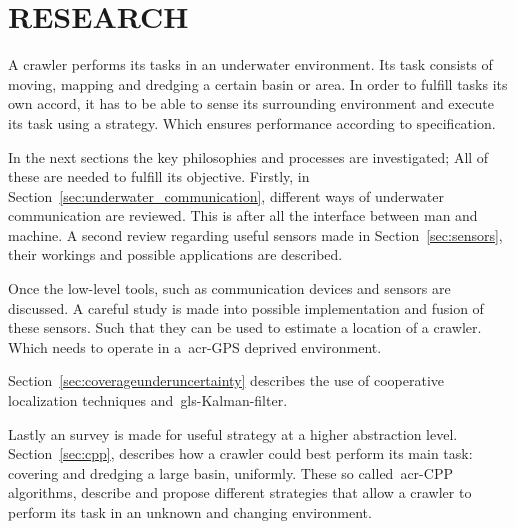\chapter{RESEARCH}\label{chap:research}
A crawler performs its tasks in an underwater environment. Its task consists of moving, mapping and dredging a certain basin or area. In order to fulfill tasks its own accord, it has to be able to sense its surrounding environment and execute its task using a strategy. Which ensures performance according to specification.

In the next sections the key philosophies and processes are investigated; All of these are needed to fulfill its objective. Firstly, in Section~\ref{sec:underwater_communication}, different ways of underwater communication are reviewed. This is after all the interface between man and machine. A second review regarding useful sensors made in Section~\ref{sec:sensors}, their workings and possible applications are described.

Once the low-level tools, such as communication devices and sensors are discussed. A careful study is made into possible implementation and fusion of these sensors. Such that they can be used to estimate a location of a crawler. Which needs to operate in a~\gls{acr-GPS} deprived environment.

Section~\ref{sec:coverageunderuncertainty} describes the use of cooperative localization techniques and~\gls{gls-Kalman-filter}.

Lastly an survey is made for useful strategy at a higher abstraction level. Section~\ref{sec:cpp}, describes how a crawler could best perform its main task: covering and dredging a large basin, uniformly. These so called~\gls{acr-CPP} algorithms, describe and propose different strategies that allow a crawler to perform its task in an unknown and changing environment.
